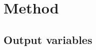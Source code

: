 \documentclass{ametsocV5}
\begin{document}



%
%

\section{Method}

\subsection{Output variables}
\end{document}
